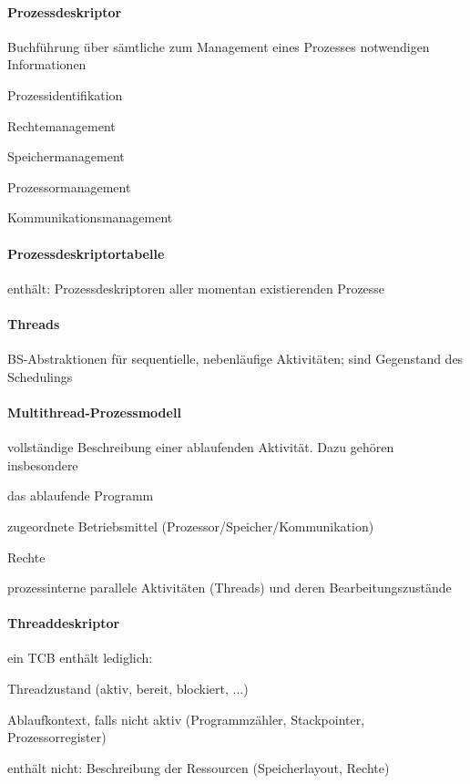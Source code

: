 \documentclass[a4paper]{article}
\begin{document}
\begin{multicols}{3}
  \paragraph{Prozessdeskriptor}
  Buchführung über sämtliche zum Management eines Prozesses notwendigen Informationen
  \begin{itemize*}
    \item Prozessidentifikation
    \item Rechtemanagement
    \item Speichermanagement
    \item Prozessormanagement
    \item Kommunikationsmanagement
  \end{itemize*}

  \paragraph{Prozessdeskriptortabelle}
  enthält: Prozessdeskriptoren aller momentan existierenden Prozesse

  \paragraph{Threads}
  BS-Abstraktionen für sequentielle, nebenläufige Aktivitäten; sind Gegenstand des Schedulings

  \paragraph{Multithread-Prozessmodell}
  vollständige Beschreibung einer ablaufenden Aktivität. Dazu gehören insbesondere
  \begin{enumerate*}
    \item das ablaufende Programm
    \item zugeordnete Betriebsmittel (Prozessor/Speicher/Kommunikation)
    \item Rechte
    \item prozessinterne parallele Aktivitäten (Threads) und deren Bearbeitungszustände
  \end{enumerate*}

  \paragraph{Threaddeskriptor}
  ein TCB enthält lediglich:
  \begin{enumerate*}
    \item Threadzustand (aktiv, bereit, blockiert, ...)
    \item Ablaufkontext, falls nicht aktiv (Programmzähler, Stackpointer, Prozessorregister)
  \end{enumerate*}
  enthält nicht: Beschreibung der Ressourcen (Speicherlayout, Rechte)


\end{multicols}
\end{document}
